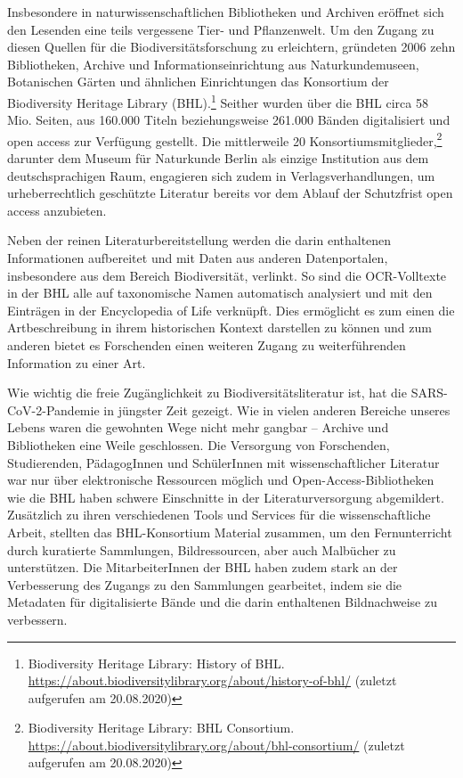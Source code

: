 \documentclass[a4paper,
fontsize=11pt,
oneside,
numbers=noperiodatend,
parskip=half-,
bibliography=totoc,
final
]{scrartcl}
\begin{document}
Insbesondere in naturwissenschaftlichen Bibliotheken und Archiven
eröffnet sich den Lesenden eine teils vergessene Tier- und Pflanzenwelt.
Um den Zugang zu diesen Quellen für die Biodiversitätsforschung zu
erleichtern, gründeten 2006 zehn Bibliotheken, Archive und
Informationseinrichtung aus Naturkundemuseen, Botanischen Gärten und
ähnlichen Einrichtungen das Konsortium der Biodiversity Heritage Library
(BHL).\footnote{Biodiversity Heritage Library: History of BHL.
  \url{https://about.biodiversitylibrary.org/about/history-of-bhl/}
  (zuletzt aufgerufen am 20.08.2020)} Seither wurden über die BHL circa
58 Mio. Seiten, aus 160.000 Titeln beziehungsweise 261.000 Bänden
digitalisiert und open access zur Verfügung gestellt. Die mittlerweile
20 Konsortiumsmitglieder,\footnote{Biodiversity Heritage Library: BHL
  Consortium.
  \url{https://about.biodiversitylibrary.org/about/bhl-consortium/}
  (zuletzt aufgerufen am 20.08.2020)} darunter dem Museum für Naturkunde
Berlin als einzige Institution aus dem deutschsprachigen Raum,
engagieren sich zudem in Verlagsverhandlungen, um urheberrechtlich
geschützte Literatur bereits vor dem Ablauf der Schutzfrist open access
anzubieten.

Neben der reinen Literaturbereitstellung werden die darin enthaltenen
Informationen aufbereitet und mit Daten aus anderen Datenportalen,
insbesondere aus dem Bereich Biodiversität, verlinkt. So sind die
OCR-Volltexte in der BHL alle auf taxonomische Namen automatisch
analysiert und mit den Einträgen in der Encyclopedia of Life verknüpft.
Dies ermöglicht es zum einen die Artbeschreibung in ihrem historischen
Kontext darstellen zu können und zum anderen bietet es Forschenden einen
weiteren Zugang zu weiterführenden Information zu einer Art.

Wie wichtig die freie Zugänglichkeit zu Biodiversitätsliteratur ist, hat
die SARS-CoV-2-Pandemie in jüngster Zeit gezeigt. Wie in vielen anderen
Bereiche unseres Lebens waren die gewohnten Wege nicht mehr gangbar --
Archive und Bibliotheken eine Weile geschlossen. Die Versorgung von
Forschenden, Studierenden, PädagogInnen und SchülerInnen mit
wissenschaftlicher Literatur war nur über elektronische Ressourcen
möglich und Open-Access-Bibliotheken wie die BHL haben schwere
Einschnitte in der Literaturversorgung abgemildert. Zusätzlich zu ihren
verschiedenen Tools und Services für die wissenschaftliche Arbeit,
stellten das BHL-Konsortium Material zusammen, um den Fernunterricht
durch kuratierte Sammlungen, Bildressourcen, aber auch Malbücher zu
unterstützen. Die MitarbeiterInnen der BHL haben zudem stark an der
Verbesserung des Zugangs zu den Sammlungen gearbeitet, indem sie die
Metadaten für digitalisierte Bände und die darin enthaltenen
Bildnachweise zu verbessern.
\end{document}
